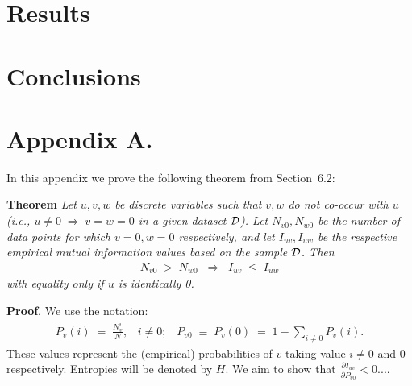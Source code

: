 \documentclass[twoside,11pt]{article}
\newcommand{\dataset}{{\cal D}}
\newcommand{\fracpartial}[2]{\frac{\partial #1}{\partial  #2}}
\begin{document}
\section{Results}

\lipsum[1-2]

\section{Conclusions}

\lipsum[1]








\appendix
\section*{Appendix A.}
\label{app:theorem}



In this appendix we prove the following theorem from
Section~6.2:

\noindent
{\bf Theorem} {\it Let $u,v,w$ be discrete variables such that $v, w$ do
not co-occur with $u$ (i.e., $u\neq0\;\Rightarrow \;v=w=0$ in a given
dataset $\dataset$). Let $N_{v0},N_{w0}$ be the number of data points for
which $v=0, w=0$ respectively, and let $I_{uv},I_{uw}$ be the
respective empirical mutual information values based on the sample
$\dataset$. Then
\begin{align*}
N_{v0} \;>\; N_{w0}\;\;\Rightarrow\;\;I_{uv} \;\leq\;I_{uw}
\end{align*}
with equality only if $u$ is identically 0.} \hfill\BlackBox

\noindent
{\bf Proof}. We use the notation:
\begin{align*}
P_v(i) \;=\;\frac{N_v^i}{N},\;\;\;i \neq 0;\;\;\;
P_{v0}\;\equiv\;P_v(0)\; = \;1 - \sum_{i\neq 0}P_v(i).
\end{align*}
These values represent the (empirical) probabilities of $v$
taking value $i\neq 0$ and 0 respectively.  Entropies will be denoted
by $H$. We aim to show that $\fracpartial{I_{uv}}{P_{v0}} < 0$....\\
\end{document}
